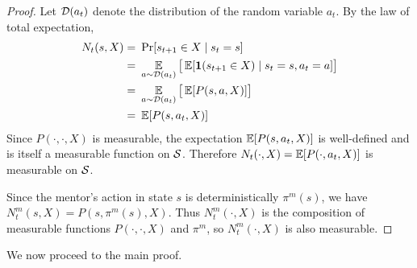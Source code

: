 \begin{proof}

Let $\mathcal{D}(a_t)$ denote the distribution of the random variable $a_t$. By the law of total expectation,
\begin{align*}
N_t(s,X) =&\ \Pr[s_{t+1} \in X \mid s_t = s]\\
=&\ \operatorname*{\mathbb{E}}_{a \sim \mathcal{D}(a_t)}\big[\operatorname*{\mathbb{E}}[\boldsymbol{1}(s_{t+1} \in X) \mid s_t = s, a_t=a]\big]\\
=&\ \operatorname*{\mathbb{E}}_{a \sim \mathcal{D}(a_t)} \big[\operatorname*{\mathbb{E}}[P(s,a,X)]\big]\\
=&\ \operatorname*{\mathbb{E}}[P(s,a_t,X)]
\end{align*}
Since $P(\cdot,\cdot,X)$ is measurable, the expectation $\operatorname*{\mathbb{E}}[P(s,a_t,X)]$ is well-defined and is itself a measurable function on $\mathcal{S}$. Therefore $N_t(\cdot,X) = \operatorname*{\mathbb{E}}[P(\cdot,a_t,X)]$ is measurable on $\mathcal{S}$.

Since the mentor's action in state $s$ is deterministically $\pi^m(s)$, we have $N_t^m(s, X)= P(s,\pi^m(s),X)$. Thus $N_t^m(\cdot,X)$ is the composition of measurable functions $P(\cdot,\cdot,X)$ and $\pi^m$, so $N_t^m(\cdot,X)$ is also measurable.
\end{proof}

We now proceed to the main proof.

\lemSplit*

